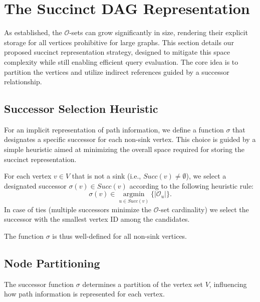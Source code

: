 \section{The Succinct DAG Representation}
\label{sec:succinct_dag_representation}

As established, the $\mathcal{O}$-sets can grow significantly in size, rendering their explicit storage for all vertices prohibitive for large graphs. This section details our proposed succinct representation strategy, designed to mitigate this space complexity while still enabling efficient query evaluation. The core idea is to partition the vertices and utilize indirect references guided by a successor relationship.

\subsection*{Successor Selection Heuristic}
\label{subsec:successor_selection}

For an implicit representation of path information, we define a function $\sigma$ that designates a specific successor for each non-sink vertex. This choice is guided by a simple heuristic aimed at minimizing the overall space required for storing the succinct representation.

\begin{definition}
    \label{def:sigma_function}
    For each vertex $v \in V$ that is not a sink (i.e., $Succ(v) \neq \emptyset$), we select a designated successor $\sigma(v) \in Succ(v)$ according to the following heuristic rule:
    \[ \sigma(v) \in \underset{u \in Succ(v)}{\operatorname{argmin}} \{ |\mathcal{O}_u| \}. \]
    In case of ties (multiple successors minimize the $\mathcal{O}$-set cardinality) we select the successor with the smallest vertex ID among the candidates.
\end{definition}

The function $\sigma$ is thus well-defined for all non-sink vertices.

\subsection*{Node Partitioning}
\label{subsec:node_partitioning}

The successor function $\sigma$ determines a partition of the vertex set $V$, influencing how path information is represented for each vertex.

